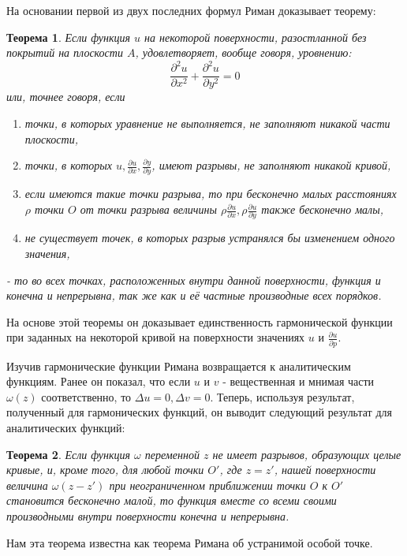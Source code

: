 \documentclass[a4paper,12pt]{article}
\newtheorem*{theorem}{Теорема}
\theoremstyle{remark}
\begin{document}
На основании первой из двух последних формул Риман доказывает теорему:
\begin{theorem}
  Если функция $u$ на некоторой поверхности, разостланной без покрытий на плоскости $A$, удовлетворяет, вообще говоря, уровнению:
  \[\dfrac{\partial ^2 u}{\partial x ^2} + \dfrac{\partial ^2 u}{\partial y ^2} = 0\]
  или, точнее говоря, если
  \begin{enumerate}
    \item точки, в которых уравнение не выполняется, не заполняют никакой части плоскости,
    \item точки, в которых $u, \frac{\partial u}{\partial x}, \frac{\partial y}{\partial y}$, имеют разрывы, не заполняют никакой кривой,
    \item если имеются такие точки разрыва, то при бесконечно малых расстояниях $\rho$ точки $O$
          от точки разрыва величины $\rho \frac{\partial u}{\partial x}, \rho \frac{\partial u}{\partial y}$
          также бесконечно малы,
    \item не существует точек, в которых разрыв устранялся бы изменением одного значения,
  \end{enumerate}
  - то во всех точках, расположенных внутри данной поверхности, функция и конечна и
  непрерывна, так же как и её частные производные всех порядков.
\end{theorem}

На основе этой теоремы он доказывает единственность гармонической функции при заданных на некоторой кривой на поверхности значениях $u$ и $\frac{\partial u}{\partial p}$.

Изучив гармонические функции Римана возвращается к аналитическим функциям. Ранее он
показал, что если $u$ и $v$ - вещественная и мнимая части $\omega(z)$ соответственно, то $\Delta u = 0, \Delta v = 0$.
Теперь, используя результат, полученный для гармонических функций, он выводит следующий результат для аналитических функций:

\begin{theorem}
  Если функция $\omega$ переменной $z$ не имеет разрывов, образующих целые кривые,
  и, кроме того, для любой точки $O'$, где $z = z'$, нашей поверхности величина $\omega(z - z')$ при
  неограниченном приближении точки $O$ к $O'$ становится бесконечно малой, то функция
  вместе со всеми своими производными внутри поверхности конечна и непрерывна.
\end{theorem}

Нам эта теорема известна как теорема Римана об устранимой особой точке.
\end{document}
